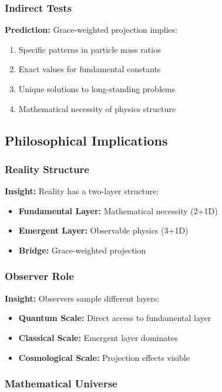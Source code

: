 \documentclass[11pt]{article}
\theoremstyle{definition}
\begin{document}
\subsubsection{Indirect Tests}

\textbf{Prediction:} Grace-weighted projection implies:
\begin{enumerate}
\item Specific patterns in particle mass ratios
\item Exact values for fundamental constants
\item Unique solutions to long-standing problems
\item Mathematical necessity of physics structure
\end{enumerate}

\subsection{Philosophical Implications}

\subsubsection{Reality Structure}

\textbf{Insight:} Reality has a two-layer structure:
\begin{itemize}
\item \textbf{Fundamental Layer:} Mathematical necessity (2+1D)
\item \textbf{Emergent Layer:} Observable physics (3+1D)
\item \textbf{Bridge:} Grace-weighted projection
\end{itemize}

\subsubsection{Observer Role}

\textbf{Insight:} Observers sample different layers:
\begin{itemize}
\item \textbf{Quantum Scale:} Direct access to fundamental layer
\item \textbf{Classical Scale:} Emergent layer dominates
\item \textbf{Cosmological Scale:} Projection effects visible
\end{itemize}

\subsubsection{Mathematical Universe}
\end{document}
